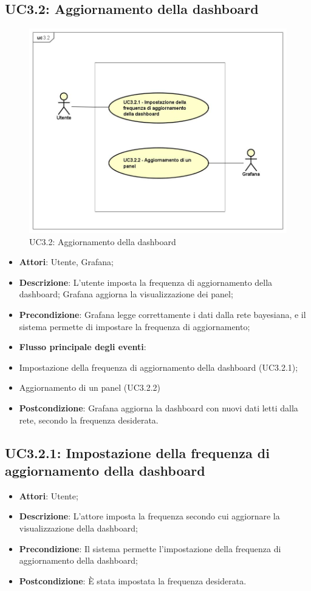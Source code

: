 \subsection{UC3.2: Aggiornamento della dashboard}
\hypertarget{UC3.2}{}
\begin{figure} [H]
	\centering
	\includegraphics[scale=0.45]{Img/UC3-2}
	\caption{UC3.2: Aggiornamento della dashboard}\label{}
\end{figure}
\begin{itemize}
	\item \textbf{Attori}: Utente, Grafana;
	\item \textbf{Descrizione}: L'utente imposta la frequenza di aggiornamento della dashboard; Grafana aggiorna la visualizzazione dei panel;
	\item \textbf{Precondizione}: Grafana legge correttamente i dati dalla rete bayesiana, e il sistema permette di impostare la frequenza di aggiornamento;
	\item \textbf{Flusso principale degli eventi}:
		\item Impostazione della frequenza di aggiornamento della dashboard (UC3.2.1);
		\item Aggiornamento di un panel (UC3.2.2)
	\item \textbf{Postcondizione}: Grafana aggiorna la dashboard con nuovi dati letti dalla rete, secondo la frequenza desiderata.
\end{itemize}
\subsection{UC3.2.1: Impostazione della frequenza di aggiornamento della dashboard}
\hypertarget{UC3.2.1}{}
\begin{itemize}
	\item \textbf{Attori}: Utente;
	\item \textbf{Descrizione}: L'attore imposta la frequenza secondo cui aggiornare la visualizzazione della dashboard;
	\item \textbf{Precondizione}: Il sistema permette l'impostazione della frequenza di aggiornamento della dashboard;
	\item \textbf{Postcondizione}: È stata impostata la frequenza desiderata.
\end{itemize}


